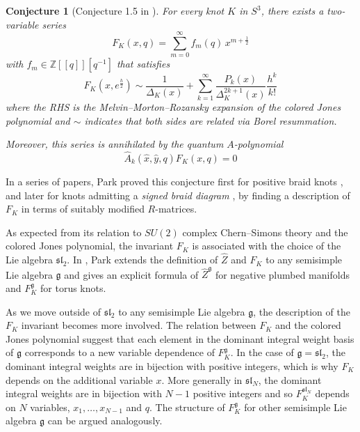 \documentclass[12pt,oneside,reqno]{amsart}
\newtheorem{conjetura}{\bf Conjecture}
\numberwithin{teorema}{section}
\numberwithin{definicion}{section}
\numberwithin{lema}{section}
\numberwithin{conjetura}{section}
\numberwithin{proposicion}{section}
\def\sl{\mathfrak{sl}}
\def\g{\mathfrak{g}}
\begin{document}
\begin{conjetura}[Conjecture 1.5 in \cite{GM}] For every knot $K$ in $S^3$, there exists a two-variable series $$F_K(x,q)=\sum_{m=0}^\infty f_m(q)\, x^{m+\frac12}$$ with $f_m\in\mathbb{Z}[[q]][q^{-1}]$ that satisfies
\begin{equation*}
    F_K(x,e^\frac{h}{2})\sim\frac{1}{\Delta_K(x)}+\sum_{k=1}^\infty \frac{P_k(x)}{\Delta^{2k+1}_K(x)}\frac{h^k}{k!}
\end{equation*}
where the RHS is the Melvin--Morton--Rozansky expansion of the colored Jones polynomial \cite{MM,Roz,BNG} and $\sim$ indicates that both sides are related via Borel resummation.

Moreover, this series is annihilated by the quantum $A$-polynomial \cite{Gar,Guk05}
\begin{equation*}
    \hat{A}_k(\hat{x},\hat{y},q)F_K(x,q)=0
\end{equation*}
\end{conjetura}

In a series of papers, Park proved this conjecture first for positive braid knots \cite{ParkLargeColor}, and later for knots admitting a \textit{signed braid diagram} \cite{Park21}, by finding a description of $F_K$ in terms of suitably modified $R$-matrices.

As expected from its relation to $SU(2)$ complex Chern--Simons theory and the colored Jones polynomial, the invariant $F_K$ is associated with the choice of the Lie algebra $\sl_2$. In \cite{Park20}, Park extends the definition of $\hat{Z}$ and $F_K$ to any semisimple Lie algebra $\g$ and gives an explicit formula of $\hat{Z}^\g$ for negative plumbed manifolds and $F_K^\g$ for torus knots.

As we move outside of $\sl_2$ to any semisimple Lie algebra $\g$, the description of the $F_K$ invariant becomes more involved. The relation between $F_K$ and the colored Jones polynomial suggest that each element in the dominant integral weight basis of $\g$ corresponds to a new variable dependence of $F_K^\g$. In the case of $\g=\sl_2$, the dominant integral weights are in bijection with positive integers, which is why $F_K$ depends on the additional variable $x$. More generally in $\sl_N$, the dominant integral weights are in bijection with $N-1$ positive integers and so $F_K^{\sl_N}$ depends on $N$ variables, $x_1,\dots,x_{N-1}$ and $q$. The structure of $F_K^\g$ for other semisimple Lie algebra $\g$ can be argued analogously. 
\end{document}
